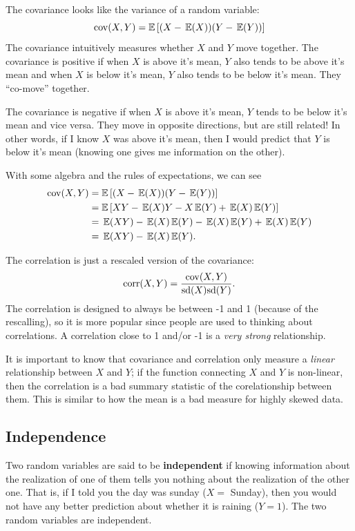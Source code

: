 \documentclass[12pt]{article}
\begin{document}
The covariance looks like the variance of a random variable:
$$
  \cov(X, Y) = \mathbb{E}\left[ (X - \expec{X}) (Y - \expec{Y}) \right]
$$
The covariance intuitively measures whether $X$ and $Y$ move together. The covariance is positive if when $X$ is above it's mean, $Y$ also tends to be above it's mean and when $X$ is below it's mean, $Y$ also tends to be below it's mean. They ``co-move'' together.

The covariance is negative if when $X$ is above it's mean, $Y$ tends to be below it's mean and vice versa. They move in opposite directions, but are still related! In other words, if I know $X$ was above it's mean, then I would predict that $Y$ is below it's mean (knowing one gives me information on the other). 

With some algebra and the rules of expectations, we can see
\begin{align*}
  \cov(X, Y) 
  &= \mathbb{E}\left[ (X - \expec{X}) (Y - \expec{Y}) \right] \\
  &= \mathbb{E}\left[ XY - \expec{X} Y - X \expec{Y} + \expec{X} \expec{Y} \right] \\ 
  &= \expec{XY} - \expec{X} \expec{Y} - \expec{X} \expec{Y} + \expec{X} \expec{Y} \\
  &= \expec{XY} - \expec{X} \expec{Y}.
\end{align*}


The correlation is just a rescaled version of the covariance:
$$
  \corr(X, Y) = \frac{\cov(X, Y)}{\sd{X} \sd{Y}}.
$$
The correlation is designed to always be between -1 and 1 (because of the rescalling), so it is more popular since people are used to thinking about correlations. A correlation close to 1 and/or -1 is a \emph{very strong} relationship. 

It is important to know that covariance and correlation only measure a \emph{linear} relationship between $X$ and $Y$; if the function connecting $X$ and $Y$ is non-linear, then the correlation is a bad summary statistic of the corelationship between them. This is similar to how the mean is a bad measure for highly skewed data.

\subsection*{Independence}

Two random variables are said to be \textbf{independent} if knowing information about the realization of one of them tells you nothing about the realization of the other one. That is, if I told you the day was sunday ($X = $ Sunday), then you would not have any better prediction about whether it is raining ($Y = 1$). The two random variables are independent. 
\end{document}
